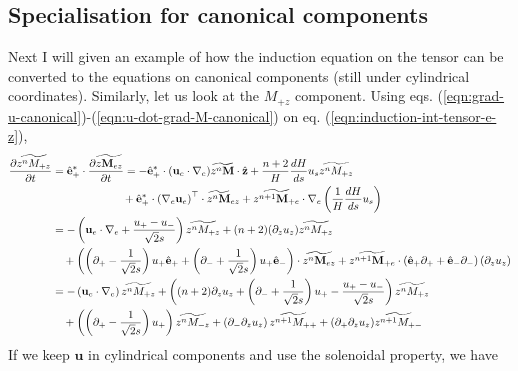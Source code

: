 \subsection{Specialisation for canonical components}

Next I will given an example of how the induction equation on the tensor can be converted to the equations on canonical components (still under cylindrical coordinates). Similarly, let us look at the $M_{+ z}$ component. Using eqs. (\ref{eqn:grad-u-canonical})-(\ref{eqn:u-dot-grad-M-canonical}) on eq. (\ref{eqn:induction-int-tensor-e-z}),
%
\[\begin{aligned}
    \frac{\partial \widetilde{z^n M_{+ z}}}{\partial t} &= \hat{\mathbf{e}}_+^* \cdot \frac{\partial \widetilde{z \mathbf{M}_{ez}}}{\partial t} = - \hat{\mathbf{e}}_+^* \cdot (\mathbf{u}_e\cdot \nabla_e) \widetilde{z^n \mathbf{M}} \cdot \hat{\mathbf{z}} + \frac{n+2}{H}\frac{dH}{ds} u_s \widetilde{z^n M_{+ z}} \\
    &\mkern 115mu + \hat{\mathbf{e}}_+^* \cdot \left(\nabla_e \mathbf{u}_e\right)^\top\cdot \widetilde{z^n \mathbf{M}}_{ez} + \widetilde{z^{n+1} \mathbf{M}_{+ e}}\cdot \nabla_e \left(\frac{1}{H}\frac{dH}{ds}u_s\right) \\ 
    &= - \left(\mathbf{u}_e\cdot \nabla_e + \frac{u_+ - u_-}{\sqrt{2} s}\right) \widetilde{z^n M_{+ z}} + (n+2) (\partial_z u_z) \widetilde{z^n M_{+ z}} \\ 
    &\quad + \left(\left(\partial_+ - \frac{1}{\sqrt{2}s}\right)u_+ \hat{\mathbf{e}}_+ + \left(\partial_- + \frac{1}{\sqrt{2}s}\right) u_+ \hat{\mathbf{e}}_-\right)\cdot \widetilde{z^n \mathbf{M}_{ez}} + \widetilde{z^{n+1} \mathbf{M}_{+ e}}\cdot \left(\hat{\mathbf{e}}_+ \partial_+ + \hat{\mathbf{e}}_- \partial_-\right) \left(\partial_z u_z\right) \\ 
    &= - \left(\mathbf{u}_e\cdot \nabla_e\right) \widetilde{z^n M_{+z}} + \left((n+2) \partial_z u_z + \left(\partial_- + \frac{1}{\sqrt{2}s}\right) u_+ - \frac{u_+ - u_-}{\sqrt{2}s}\right) \widetilde{z^n M_{+z}} \\
    &\quad + \left(\left(\partial_+ - \frac{1}{\sqrt{2}s}\right)u_+\right) \widetilde{z^n M_{-z}} + \left(\partial_- \partial_z u_z\right) \widetilde{z^{n+1} M_{++}} + (\partial_+ \partial_z u_z) \widetilde{z^{n+1} M_{+-}}
\end{aligned}\]
%
If we keep $\mathbf{u}$ in cylindrical components and use the solenoidal property, we have
